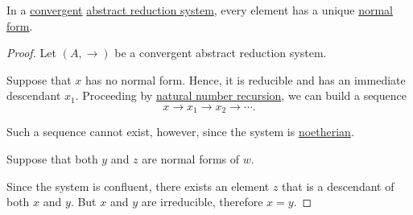 \begin{proposition}\label{thm:convergent_reduction_system_normal_forms}
  In a \hyperref[def:abstract_rewriting_convergence/convergent]{convergent} \hyperref[def:abstract_reduction_system]{abstract reduction system}, every element has a unique \hyperref[def:abstract_rewriting_system/normal_form]{normal form}.
\end{proposition}
\begin{proof}
  Let \( (A, \to) \) be a convergent abstract reduction system.

   Suppose that \( x \) has no normal form. Hence, it is reducible and has an immediate descendant \( x_1 \). Proceeding by \hyperref[rem:natural_number_recursion]{natural number recursion}, we can build a sequence
  \begin{equation*}
    x \to x_1 \to x_2 \to \cdots.
  \end{equation*}

  Such a sequence cannot exist, however, since the system is \hyperref[def:abstract_rewriting_convergence/noetherian]{noetherian}.

   Suppose that both \( y \) and \( z \) are normal forms of \( w \).

  Since the system is confluent, there exists an element \( z \) that is a descendant of both \( x \) and \( y \). But \( x \) and \( y \) are irreducible, therefore \( x = y \).
\end{proof}

